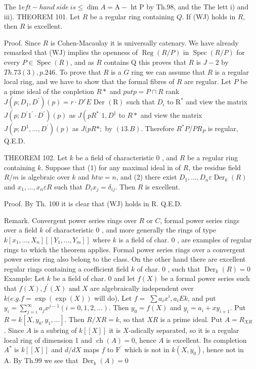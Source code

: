 The $1 e f t-h a n d ~ s i d e ~ i s \leqslant \operatorname{dim} A=\mathrm{A}-$ ht $\mathrm{P}$ by Th.98, and the The lett i) and iii). THEOREM 101. Let $R$ be a regular ring containing $Q$. If (WJ) holds in $R$, then $R$ is excellent.

Proof. Since $R$ is Cohen-Macaulay it is universally catenary. We have already remarked that (WJ) implies the openness of $\operatorname{Reg}(R / P)$ in $\operatorname{Spec}(R / P)$ for every $P \in \operatorname{Spec}(R)$, and as $R$ contains Q this proves that $R$ is $J-2$ by $T h .73(3), p .246$. To prove that $R$ is a $G$ ring we can assume that $R$ is a regular local ring, and we have to show that the formal fibres of $R$ are regular. Let $P$ be a pime ideal of the conpletion $R *$ and $p u t p=P \cap R$ rank $J\left(p ; D_{1}, D^{\prime}\right)(p)=r \cdot D^{r} E$ Der $(\mathrm{R})$ such that $D_{i}$ to $\mathrm{R}^{*}$ and view the matrix $J\left(p ; D^{\prime} 1^{\prime} \cdot D^{\prime}\right)(p)$ as $J\left(p R^{*}\right.$ $1, D^{1}$ to $R *$ and view the matrix $J\left(p ; D^{1}, \ldots, D^{\prime}\right)(p)$ as $J(p R * ;$ by $(13 . B)$. Therefore $R^{*} P / P R{ }_{P}$ is regular, Q.E.D.

THEOREM 102. Let $k$ be a field of characteristic 0 , and $R$ be a regular ring containing $k$. Suppose that (1) for any maximal ideal in of $R$, the residue field $R / m$ is algebraic over $k$ and $h t w=n$, and (2) there exist $D_{1}, \ldots, D_{n} \varepsilon \operatorname{Der}_{k}(R)$ and $x_{1}, \ldots, x_{n} \varepsilon R$ such that $D_{i} x_{j}=\delta_{i j} .$ Then $R$ is excellent.

Proof. By Th. 100 it is clear that (WJ) holds in R. Q.E.D.

Remark. Convergent power series rings over $R$ or $C$, formal power series rings over a field $k$ of characteristic 0 , and more generally the rings of type $k\left[x_{1}, \ldots, X_{n}\right]\left[\left[Y_{1}, \ldots, Y_{m}\right]\right]$ where $k$ is a field of char. 0 , are examples of regular rings to which the theorem applies. Formal power series rings over a convergent power series ring also belong to the class. On the other hand there are excellent regular rings containing a coefficient field $k$ of char. 0 , such that $\operatorname{Der}_{k}(R)=0$ Example: Let $k$ be a field of char. 0 and let $f(X)$ be a formal power series such that $f(X), f^{\prime}(X)$ and $X$ are algebraically independent over $k(e . g . f=\exp (\exp (X))$ will do), Let $f=$ $\sum a_{i} x^{i}, a_{i} E k$, and put $y_{i}=\sum_{j=i}^{\infty} a_{j} x^{j-1}(i=0,1,2, \ldots)$. Then $y_{0}=f(X)$ and $y_{i}=a_{i}+x y_{i+1}$. Put $R=k\left[X, y_{0}, y_{1}, \ldots\right]$. Then $R / X R=k$, so that $X R$ is a prime ideal. Put $A=R_{X R}$. Since $A$ is a subring of $k[[X]]$ it is $X$-adically separated, so it is a regular local ring of dimension 1 and $\operatorname{ch}(A)=0$, hence $A$ is excellent. Its completion $A^{*}$ is $k[[X]]$ and $d / d X$ maps $f$ to $\mathrm{F}^{\prime}$ which is not in $k\left(X, y_{0}\right)$, hence not in A. By Th.99 we see that $\operatorname{Der}_{k}(A)=0$

